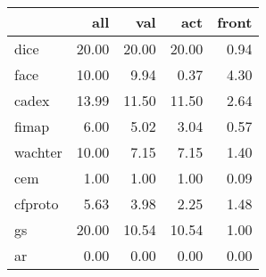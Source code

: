 \begin{tabular}{lrrrr}
\hline
{}                  &    all &    val &    act &  front \\ \hline
\hline
dice                &  20.00 &  20.00 &  20.00 &   0.94 \\ \hline
face                &  10.00 &   9.94 &   0.37 &   4.30 \\ \hline
cadex               &  13.99 &  11.50 &  11.50 &   2.64 \\ \hline
fimap               &   6.00 &   5.02 &   3.04 &   0.57 \\ \hline
wachter             &  10.00 &   7.15 &   7.15 &   1.40 \\ \hline
cem                 &   1.00 &   1.00 &   1.00 &   0.09 \\ \hline
cfproto             &   5.63 &   3.98 &   2.25 &   1.48 \\ \hline
gs                  &  20.00 &  10.54 &  10.54 &   1.00 \\ \hline
ar                  &   0.00 &   0.00 &   0.00 &   0.00 \\ \hline
\hline
\end{tabular}
